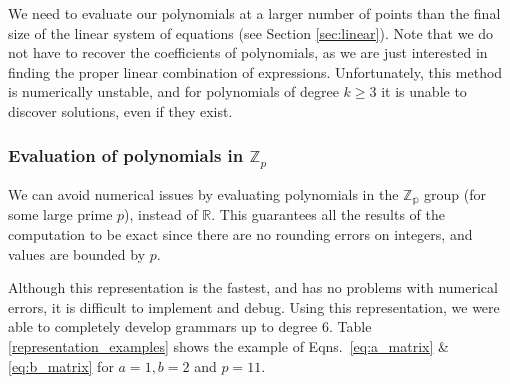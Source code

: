 We need to evaluate our polynomials at a larger number of points than
the final size of the linear system of equations (see Section
\ref{sec:linear}). Note that we do not have to recover the
coefficients of polynomials, as we are just interested in finding the
proper linear combination of expressions.  Unfortunately, this method
is numerically unstable, and for polynomials of degree $k \geq 3$ it
is unable to discover solutions, even if they exist.

\subsubsection{Evaluation of polynomials in $\mathbb{Z}_p$}
We can avoid numerical issues by evaluating polynomials in the
$\mathbb{Z_p}$ group (for some large prime $p$), instead of
$\mathbb{R}$. This guarantees all the results of the computation
to be exact since there are no rounding errors on integers, and values are
bounded by $p$.

Although this representation is the fastest, and has no problems with
numerical errors, it is difficult to implement and debug. Using this
representation, we were able to completely develop grammars up to 
degree $6$. Table \ref{representation_examples} shows the example
of Eqns.~\ref{eq:a_matrix} \& \ref{eq:b_matrix} for $a = 1, b = 2$ and $p = 11$.

